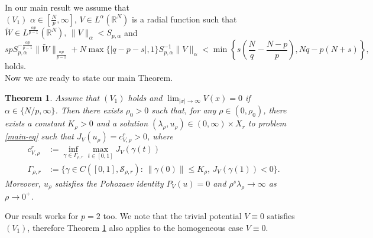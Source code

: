 \documentclass[11pt,reqno]{amsart}
\newtheorem{theorem}{Theorem}
\theoremstyle{definition}
\numberwithin{equation}{section}
\numberwithin{theorem}{section}
\numberwithin{equation}{section}
\numberwithin{theorem}{section}
\newcommand{\R}{\mathbb{R}}
\begin{document}
In our main result we assume that \\

$(V_1)$ $\alpha\in [\frac{N}{p},\infty],\,V\in L^\alpha(\R^N)$ is a radial function such that $\tilde{W}\in L^{\frac{\alpha p}{p-1}}(\R^N),\,\|V\|_\alpha<S_{p,\alpha}$ and
\begin{equation}
\label{cond-norm-V}
sp S_{p,\alpha}^{-\frac{\alpha p}{p-1}}\|\tilde{W}\|_{\frac{\alpha p}{p-1}}+N\max\{|q-p-s|,1\}S_{p,\alpha}^{-1}\|V\|_\alpha <\min\left\{s\left(\frac{N}{q}-\frac{N-p}{p}\right),Nq-p(N+s)\right\},
\end{equation}
holds.\\

Now we are ready to state our main Theorem.
\begin{theorem}\label{main-th-hom}
Assume that $(V_1)$ holds and $\lim_{|x|\to\infty}V(x)=0$ if $\alpha\in\{N/p,\infty\}$. Then there exists $\rho_0>0$ such that, for any $\rho\in(0,\rho_0)$, there exists a constant $K_\rho>0$ and a solution $(\lambda_\rho,u_\rho)\in (0,\infty)\times X_r$ to problem \eqref{main-eq} such that $J_V(u_\rho)=c_{V,\rho}^r>0$, where
\begin{equation}
\begin{aligned}
c_{V,\rho}^r&:=\inf_{\gamma\in\Gamma_{\rho,r}}\max_{t\in[0,1]}J_V(\gamma(t))\\
\Gamma_{\rho,r}&:=\{\gamma\in C([0,1],\mathcal{S}_{\rho,r}):\,\|\gamma(0)\|\le K_\rho,\,J_V(\gamma(1))<0\}.
\end{aligned}     
\end{equation}
Moreover, $u_\rho$ satisfies the Pohozaev identity $P_V(u)=0$ and $\rho^s\lambda_\rho\to\infty$ as $\rho\to 0^+$.
\end{theorem}
Our result works for $p=2$ too. We note that the trivial potential $V\equiv 0$ satisfies $(V_1)$, therefore Theorem \ref{main-th-hom} also applies to the homogeneous case $V\equiv 0$.\\
\end{document}
